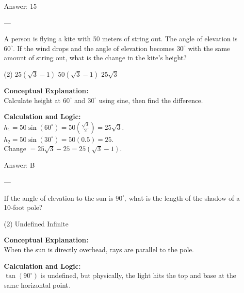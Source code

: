 \documentclass[11pt,paper=a4,answers]{exam}
\begin{document}
\begin{questions}
\begin{solution}
\vspace{15pt}
Answer: \colorbox{yellow!100}{15}
\end{solution}

---

\question
A person is flying a kite with 50 meters of string out. The angle of elevation is $60^\circ$. If the wind drops and the angle of elevation becomes $30^\circ$ with the same amount of string out, what is the change in the kite's height?
\begin{tasks}(2)
    \task $25(\sqrt{3}-1)$
    \task $50(\sqrt{3}-1)$
    \task $25\sqrt{3}$
\end{tasks}

\begin{solution}
\textbf{Conceptual Explanation:} \\
Calculate height at $60^\circ$ and $30^\circ$ using sine, then find the difference.

\vspace{10pt}
\textbf{Calculation and Logic:} \\
$h_1 = 50 \sin(60^\circ) = 50(\frac{\sqrt{3}}{2}) = 25\sqrt{3}$. \\
$h_2 = 50 \sin(30^\circ) = 50(0.5) = 25$. \\
Change $= 25\sqrt{3} - 25 = 25(\sqrt{3}-1)$.

\vspace{15pt}
Answer: \colorbox{yellow!100}{B}
\end{solution}

---

\question
If the angle of elevation to the sun is $90^\circ$, what is the length of the shadow of a 10-foot pole?
\begin{tasks}(2)
    \task Undefined
    \task Infinite
\end{tasks}

\begin{solution}
\textbf{Conceptual Explanation:} \\
When the sun is directly overhead, rays are parallel to the pole.

\vspace{10pt}
\textbf{Calculation and Logic:} \\
$\tan(90^\circ)$ is undefined, but physically, the light hits the top and base at the same horizontal point.


\end{solution}
\end{questions}
\end{document}
